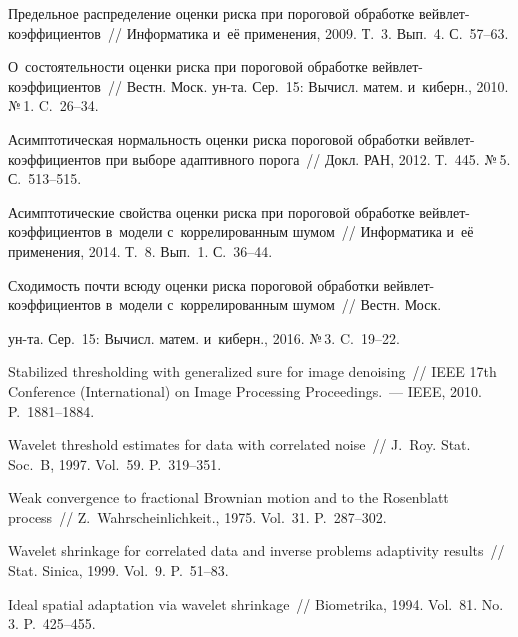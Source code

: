 \begin{multicols}{2}
{{\begin{thebibliography}{99}
 Предельное распределение оценки рис\-ка при пороговой обработке 
вейв\-лет-ко\-эф\-фи\-ци\-ен\-тов~// Информатика и~её
применения, 2009. Т.~3. Вып.~4. С.~57--63.

О~со\-сто\-ятель\-ности оценки рис\-ка при пороговой обработке вейв\-лет-ко\-эф\-фи\-ци\-ен\-тов~// 
Вестн. Моск.
 ун-та. Сер.~15: Вычисл. матем. и~киберн., 2010. №\,1. C.~26--34.

 Асимптотическая нор\-маль\-ность оценки рис\-ка пороговой обработки 
вейв\-лет-ко\-эф\-фи\-ци\-ен\-тов при выборе адап\-тив\-но\-го порога~// 
Докл. РАН, 2012. Т.~445. №\,5. С.~513--515.

Асимптотические свойства оценки риска при пороговой обработке вейв\-лет-ко\-эф\-фи\-ци\-ен\-тов 
в~модели
с~коррелированным шумом~// Информатика и~её применения, 2014. Т.~8. Вып.~1. С.~36--44.

 Сходимость почти всюду оценки рис\-ка пороговой обработки 
вейв\-лет-ко\-эф\-фи\-ци\-ен\-тов в~модели с~коррелированным шумом~// 
Вестн. Моск.
\linebreak\vspace*{-12pt}

\pagebreak

\noindent
 ун-та. Сер.~15: Вычисл. матем. и~киберн., 2016. №\,3. C.~19--22.

Stabilized thresholding with generalized sure for image denoising~// 
IEEE 17th  Conference (International) on Image Processing Proceedings.~--- 
IEEE, 2010. P.~1881--1884.

Wavelet threshold estimates for data with correlated noise~// J.~Roy. Stat.
Soc.~B, 1997. Vol.~59. P.~319--351.

{}
 Weak convergence to fractional Brownian motion and to the 
Rosenblatt process~// Z.~Wahrscheinlichkeit., 1975. Vol.~31. P.~287--302.

Wavelet shrinkage for correlated data and inverse problems adaptivity results~// 
Stat. Sinica, 1999. Vol.~9. P.~51--83.



Ideal spatial adaptation via wavelet shrinkage~// Biometrika, 1994. Vol.~81. No.\,3.
P.~425--455.


\end{thebibliography}}}
\end{multicols}
